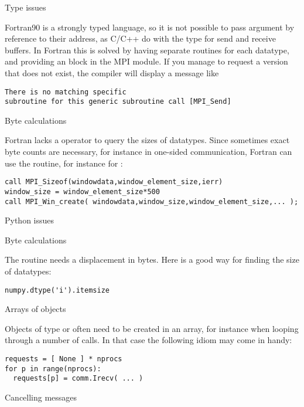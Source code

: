  {Type issues}

Fortran90 is a strongly typed language, so it is not possible to pass
argument by reference to their address, as C/C++ do with the 
type for send and receive buffers. In Fortran this is solved by having
separate routines for each datatype, and providing an  block
in the MPI module. If you manage to request a version that does not exist,
the compiler will display a message like
\begin{verbatim}
There is no matching specific 
subroutine for this generic subroutine call [MPI_Send]
\end{verbatim}

 {Byte calculations}
\label{sec:f-sizeof}

Fortran lacks a  operator to query the sizes of datatypes.
Since sometimes exact byte counts are necessary,
for instance in one-sided communication,
Fortran can use the  routine,
for instance for :
\begin{verbatim}
call MPI_Sizeof(windowdata,window_element_size,ierr)
window_size = window_element_size*500
call MPI_Win_create( windowdata,window_size,window_element_size,... );
\end{verbatim}


 {Python issues}
\label{sec:python-stuff}

 {Byte calculations}

The  routine needs a displacement in
bytes. Here is a good way for finding the size of  datatypes:
\begin{verbatim}
numpy.dtype('i').itemsize
\end{verbatim}

 {Arrays of objects}

Objects of type  or  often need to be created
in an array, for instance when looping through a number of  calls.
In that case the following idiom may come in handy:
\begin{verbatim}
requests = [ None ] * nprocs
for p in range(nprocs):
  requests[p] = comm.Irecv( ... )
\end{verbatim}


 {Cancelling messages}

